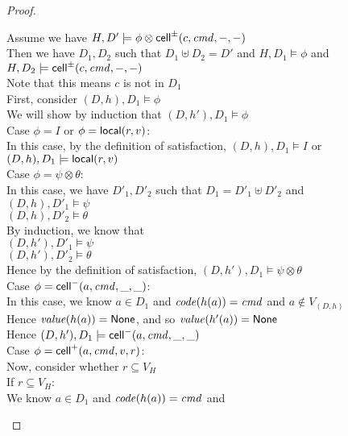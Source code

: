 \begin{proof}
\begin{tabbedproof}
\oo Assume we have $H, D' \models \phi \otimes \mathsf{cell}^{\pm}({c}, {\mathit{cmd}}, {-}, {-})$ \\
\oo Then we have $D_1, D_2$ such that $D_1 \uplus D_2 = D'$ and $H, D_1 \models \phi$ and $H, D_2 \models \mathsf{cell}^{\pm}({c}, {\mathit{cmd}}, {-}, {-})$ \\
\oo Note that this means $c$ is not in $D_1$ \\
\oo First, consider $(D,h), D_1 \models \phi$ \\
\ooo We will show by induction that $(D,h'), D_1 \models \phi$ \\
\ooo Case $\phi = I$ or $\phi = \mathsf{local}({r}, {v})$: \\
\oooo In this case, by the definition of satisfaction, $(D,h), D_1 \models I$ or $(D,h), D_1 \models \mathsf{local}({r}, {v})$\\
\ooo Case $\phi = \psi \otimes \theta$: \\
\oooo In this case, we have $D'_1, D'_2$ such that $D_1 = D'_1 \uplus D'_2$ and \\
\oooox $(D,h), D'_1 \models \psi$ \\
\oooox $(D,h), D'_2 \models \theta$ \\
\oooo By induction, we know that \\
\oooox $(D,h'), D'_1 \models \psi$ \\
\oooox $(D,h'), D'_2 \models \theta$ \\
\oooo Hence by the definition of satisfaction, $(D,h'), D_1 \models \psi \otimes \theta$ \\
\ooo Case $\phi = \mathsf{cell}^{-}({a}, {\mathit{cmd}}, {\_}, {\_})$: \\
\oooo In this case, we know $a \in D_1$ and $\mathit{code}(h(a)) = \mathit{cmd}$ and $a \not\in V_{(D,h)}$ \\
\oooo Hence $\mathit{value}(h(a)) = \mathsf{None}$, and so $\mathit{value}(h'(a)) = \mathsf{None}$ \\
\oooo Hence $(D,h'), D_1 \models \mathsf{cell}^{-}({a}, {\mathit{cmd}}, {\_}, {\_})$ \\
\ooo Case $\phi = \mathsf{cell}^{+}({a}, {\mathit{cmd}}, {v}, {r})$: \\
\oooo Now, consider whether $r \subseteq V_H$ \\
\oooo If $r \subseteq V_H$: \\
\ooooo We know $a \in D_1$ and $\mathit{code}(h(a)) = \mathit{cmd}$ and 

\end{tabbedproof}
\end{proof}
